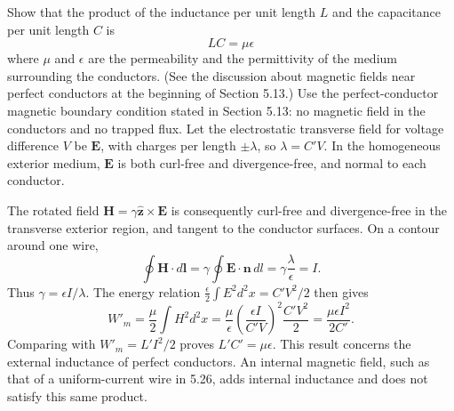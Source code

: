 \begin{center}
\end{center}

Show that the product of the inductance per unit length $L$ and the capacitance per unit length $C$ is
\[
LC=\mu\epsilon
\]
where $\mu$ and $\epsilon$ are the permeability and the permittivity of the medium surrounding the conductors. (See the discussion about magnetic fields near perfect conductors at the beginning of Section 5.13.)
\solution
Use the perfect-conductor magnetic boundary condition stated in
Section 5.13: no magnetic field in the conductors and no trapped flux.
Let the electrostatic transverse field for voltage difference $V$
be $\mathbf E$, with charges per length $\pm\lambda$, so $\lambda=C'V$.
In the homogeneous exterior medium, $\mathbf E$ is both curl-free
and divergence-free, and normal to each conductor.

The rotated field
$\mathbf H=\gamma\widehat{\mathbf z}\times\mathbf E$ is consequently
curl-free and divergence-free in the transverse exterior region,
and tangent to the conductor surfaces. On a contour around one wire,
\[
\oint\mathbf H\cdot d\mathbf l
=\gamma\oint\mathbf E\cdot\mathbf n\,dl
=\gamma\frac{\lambda}{\epsilon}=I.
\]
Thus $\gamma=\epsilon I/\lambda$.
The energy relation
$\frac{\epsilon}{2}\int E^2d^2x=C'V^2/2$ then gives
\[
W'_m=\frac{\mu}{2}\int H^2d^2x
=\frac{\mu}{\epsilon}\left(\frac{\epsilon I}{C'V}\right)^2
\frac{C'V^2}{2}
=\frac{\mu\epsilon I^2}{2C'}.
\]
Comparing with $W'_m=L'I^2/2$ proves
$\boxed{L'C'=\mu\epsilon}$.
This result concerns the external inductance of perfect conductors.
An internal magnetic field, such as that of a uniform-current wire
in 5.26, adds internal inductance and does not satisfy this same product.


